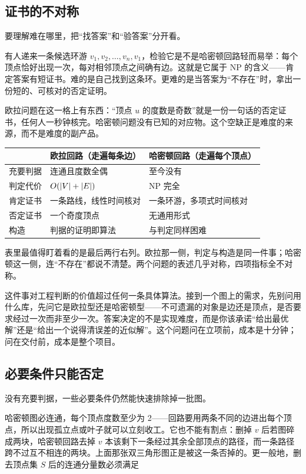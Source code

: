 \subsection{证书的不对称}

要理解难在哪里，把``找答案''和``验答案''分开看。

有人递来一条候选环游 \(v_1,v_2,\ldots,v_n,v_1\)，检验它是不是哈密顿回路轻而易举：每个顶点恰好出现一次，每对相邻顶点之间确有边。这就是它属于 NP 的含义——肯定答案有短证书。难的是自己找到这条环。更难的是当答案为``不存在''时，拿出一份短的、可核对的否定证明。

欧拉问题在这一格上有东西：``顶点 \(u\) 的度数是奇数''就是一份一句话的否定证书，任何人一秒钟核完。哈密顿问题没有已知的对应物。这个空缺正是难度的来源，而不是难度的副产品。

{\def\LTcaptype{none}
\begin{longtable}{@{}lll@{}}
\toprule\noalign{}
 & 欧拉回路（走遍每条边） & 哈密顿回路（走遍每个顶点） \\
\midrule\noalign{}
\endhead
\bottomrule\noalign{}
\endlastfoot
充要判据 & 连通且度数全偶 & 至今没有 \\
判定代价 & \(O(\left|V\right|+\left|E\right|)\) & NP 完全 \\
肯定证书 & 一条路线，线性时间核对 & 一条环游，多项式时间核对 \\
否定证书 & 一个奇度顶点 & 无通用形式 \\
构造 & 判据的证明即算法 & 与判定同样困难 \\
\end{longtable}
}

表里最值得盯着看的是最后两行右列。欧拉那一侧，判定与构造是同一件事；哈密顿这一侧，连``不存在''都说不清楚。两个问题的表述几乎对称，四项指标全不对称。

这件事对工程判断的价值超过任何一条具体算法。接到一个图上的需求，先别问用什么库，先问它是欧拉型还是哈密顿型——不可遗漏的对象是边还是顶点，是否要求经过一次而非至少一次。答案决定的不是实现难度，而是你该承诺``给出最优解''还是``给出一个说得清误差的近似解''。这个问题问在立项前，成本是十分钟；问在交付前，成本是整个项目。

\subsection{必要条件只能否定}

没有充要判据，一些必要条件仍然能快速排除掉一批图。

哈密顿图必连通，每个顶点度数至少为 2——回路要用两条不同的边进出每个顶点，所以出现孤立点或叶子就可以立刻收工。它也不能有割点：删掉 \(v\) 后若图碎成两块，哈密顿回路去掉 \(v\) 本该剩下一条经过其余全部顶点的路径，而一条路径跨不过互不相连的两块。上面那张双三角形图正是被这一条否掉的。更一般地，删去顶点集 \(S\) 后的连通分量数必须满足

